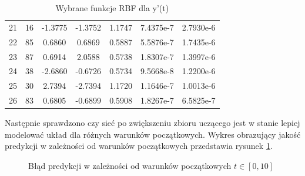 \begin{table}[ht!]
\begin{tabular}{ |c| c| c| c| c| c| c| }
 21 &  16  & -1.3775 &  -1.3752  &  1.1747 &   7.4375e-7 & 2.7930e-6  \\
 22 &  85  &  0.6860 &   0.6869  &  0.5887 &   5.5876e-7 & 1.7435e-6  \\
 23 &  87  &  0.6914 &   2.0588  &  0.5738 &   1.8307e-7 & 1.3997e-6  \\
 24 &  38  & -2.6860 &  -0.6726  &  0.5734 &   9.5668e-8 & 1.2200e-6  \\
 25 &  30  &  2.7394 &  -2.7394  &  1.1720 &   1.1646e-7 & 1.0013e-6  \\
 26 &  83  &  0.6805 &  -0.6899  &  0.5908 &   1.8267e-7 & 6.5825e-7  \\
   \hline
\end{tabular}

\caption{Wybrane funkcje RBF dla y'(t)}
\label{tab:rbf_tabela2_x2}
\end{table}

\clearpage
 Następnie sprawdzono czy sieć po zwiększeniu zbioru uczącego jest w stanie lepiej modelować układ dla różnych warunków początkowych. Wykres obrazujący jakość predykcji w zależności od warunków początkowych przedstawia rysunek \ref{img:err_initial2}.


\begin{figure}[ht!]
	\centering

	

	\caption{Błąd predykcji w zależności od warunków początkowych $t \in [0,10]$}
	\label{img:err_initial2}
\end{figure}

